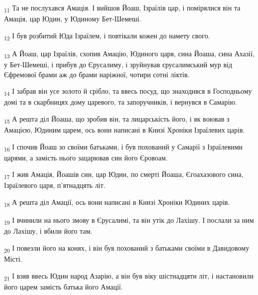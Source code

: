 \begin{tcolorbox}
\textsubscript{11} Та не послухався Амація. І вийшов Йоаш, Ізраїлів цар, і помірялися він та Амація, цар Юдин, у Юдиному Бет-Шемеші.
\end{tcolorbox}
\begin{tcolorbox}
\textsubscript{12} І був розбитий Юда Ізраїлем, і повтікали кожен до намету свого.
\end{tcolorbox}
\begin{tcolorbox}
\textsubscript{13} А Йоаш, цар Ізраїлів, схопив Амацію, Юдиного царя, сина Йоаша, сина Ахазії, у Бет-Шемеші, і прибув до Єрусалиму, і зруйнував єрусалимський мур від Єфремової брами аж до брами наріжної, чотири сотні ліктів.
\end{tcolorbox}
\begin{tcolorbox}
\textsubscript{14} І забрав він усе золото й срібло, та ввесь посуд, що знаходився в Господньому домі та в скарбницях дому царевого, та запоручників, і вернувся в Самарію.
\end{tcolorbox}
\begin{tcolorbox}
\textsubscript{15} А решта діл Йоаша, що зробив він, та лицарськість його, і як воював з Амацією, Юдиним царем, ось вони написані в Книзі Хроніки Ізраїлевих царів.
\end{tcolorbox}
\begin{tcolorbox}
\textsubscript{16} І спочив Йоаш зо своїми батьками, і був похований у Самарії з Ізраїлевими царями, а замість нього зацарював син його Єровоам.
\end{tcolorbox}
\begin{tcolorbox}
\textsubscript{17} І жив Амація, Йоашів син, цар Юдин, по смерті Йоаша, Єгоахазового сина, Ізраїлевого царя, п'ятнадцять літ.
\end{tcolorbox}
\begin{tcolorbox}
\textsubscript{18} А решта діл Амації, ось вони написані в Книзі Хроніки Юдиних царів.
\end{tcolorbox}
\begin{tcolorbox}
\textsubscript{19} І вчинили на нього змову в Єрусалимі, та він утік до Лахішу. І послали за ним до Лахішу, і вбили його там.
\end{tcolorbox}
\begin{tcolorbox}
\textsubscript{20} І повезли його на конях, і він був похований з батьками своїми в Давидовому Місті.
\end{tcolorbox}
\begin{tcolorbox}
\textsubscript{21} І взяв ввесь Юдин народ Азарію, а він був віку шістнадцяти літ, і настановили його царем замість батька його Амації.
\end{tcolorbox}
